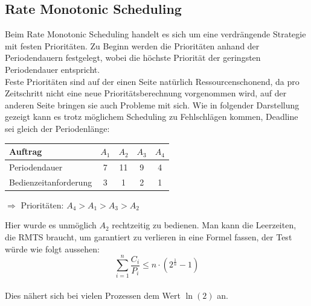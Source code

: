 \subsection{Rate Monotonic Scheduling}
Beim Rate Monotonic Scheduling handelt es sich um eine verdrängende Strategie mit festen Prioritäten.
Zu Beginn werden die Prioritäten anhand der Periodendauern festgelegt, wobei die höchste Priorität der 
geringsten Periodendauer entspricht. \\
Feste Prioritäten sind auf der einen Seite natürlich Ressourcenschonend, da pro Zeitschritt nicht eine neue 
Prioritätsberechnung vorgenommen wird, auf der anderen Seite bringen sie auch Probleme mit sich. Wie in 
folgender Darstellung gezeigt kann es trotz möglichem Scheduling zu Fehlschlägen kommen, Deadline sei 
gleich der Periodenlänge: \\
\begin{center}
\begin{tabular}{l||c|c|c|c}
	Auftrag               & \(A_1\)  & \(A_2\)  & \(A_3\) & \(A_4\) \\ \hline \hline
	Periodendauer		  & 7        & 11       & 9       & 4       \\ \hline
	Bedienzeitanforderung & 3        &  1       & 2       & 1       \\
\end{tabular}
\quad \(\Rightarrow\) Prioritäten: \(A_4 > A_1 > A_3 > A_2\)
\end{center}
\begin{center}
\begin{blockgraph}{25}{1}{0.4}
    
\end{blockgraph}
\end{center}
Hier wurde es unmöglich \(A_2\) rechtzeitig zu bedienen. Man kann die Leerzeiten, die RMTS braucht, um 
garantiert zu verlieren in eine Formel fassen, der Test würde wie folgt aussehen: \\
\[\sum\limits_{i=1}^{n}\frac{C_i}{P_i} \leq n\cdot(2^{\frac{1}{n}}-1)\] \\
Dies nähert sich bei vielen Prozessen dem Wert \(\ln(2)\) an.

